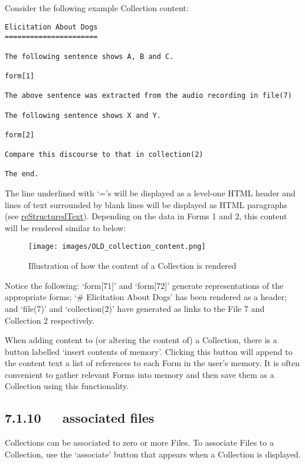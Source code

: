\documentclass[letterpaper,10pt,english]{sphinxmanual}
\begin{document}
Consider the following example Collection content:

\begin{Verbatim}[commandchars=\\\{\}]
Elicitation About Dogs
======================

The following sentence shows A, B and C.

form[1]

The above sentence was extracted from the audio recording in file(7)

The following sentence shows X and Y.

form[2]

Compare this discourse to that in collection(2)

The end.
\end{Verbatim}

The line underlined with `='s will be displayed as a level-one HTML header
and lines of text surrounded by blank lines will be displayed as HTML paragraphs
(see {\hyperref[documentation:restructuredtext]{reStructuredText}}).  Depending on the data in Forms 1 and 2, this content
will be rendered similar to below:
\begin{figure}[htbp]
\centering
\capstart

\texttt{[image: images/OLD\_collection\_content.png]}
\caption{Illustration of how the content of a Collection is rendered}\end{figure}

Notice the following: `form{[}71{]}' and `form{[}72{]}' generate representations of the
appropriate forms; `\# Elicitation About Dogs' has been rendered as a header; and
`file(7)' and `collection(2)' have generated as links to the File 7 and
Collection 2 respectively.

When adding content to (or altering the content of) a Collection, there is a
button labelled `insert contents of memory'.  Clicking this button will append
to the content text a list of references to each Form in the user's memory.  It
is often convenient to gather relevant Forms into memory and then save them as
a Collection using this functionality.


\subsection{7.1.10   associated files}
\label{documentation:associated-files}
Collections can be associated to zero or more Files.  To associate Files to a
Collection, use the `associate' button that appears when a Collection is
displayed.
\end{document}
